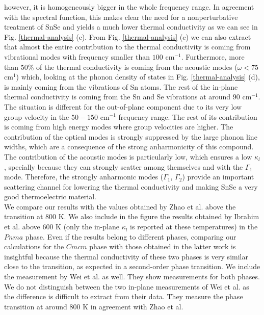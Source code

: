 however, it is homogeneously bigger in the whole frequency range. In agreement with the spectral function, this
makes clear the need for a nonperturbative treatment of SnSe and yields a much lower thermal conductivity as we can
see in Fig. \ref{thermal-analysis} (c). From Fig. \ref{thermal-analysis} (c) we can also extract that almost the 
entire contribution to the thermal conductivity is coming from vibrational modes with frequency smaller than $100$ 
cm$^{-1}$. Furthermore, more than $50\%$ of the thermal conductivity is coming from the acoustic modes
($\omega<75$ cm$^{1}$) which, looking at the phonon density of states in Fig. \ref{thermal-analysis} (d), is mainly
coming from the vibrations of Sn atoms. The rest of the in-plane thermal conductivity is coming from the Sn and Se
vibrations at around $90$ cm$^{-1}$. The situation is different for the out-of-plane component due to its very low
group velocity in the $50-150$ cm$^{-1}$ frequency range. The rest of its contribution is coming from high energy
modes where group velocities are higher. The contribution of the optical modes is strongly suppressed by the large
phonon line widths, which are a consequence of the strong anharmonicity of this compound. The contribution of the
acoustic modes is particularly low, which ensures a low $\kappa_l$, specially because they can strongly scatter
among themselves and with the $\Gamma_1$ mode. Therefore, the strongly anharmonic modes ($\Gamma_{1}$, $\Gamma_{2}$)
provide an important scattering channel for lowering the thermal conductivity and making SnSe a very good
thermoelectric material. \\

We compare our results with the values obtained by Zhao et al.\cite{zhao2014ultralow} above the transition at $800$ K. We also include in the figure the results obtained by Ibrahim et al.\cite{ibrahim2017reinvestigation} above $600$ K (only the in-plane $\kappa_l$ is reported at these temperatures) in the $Pnma$ phase. Even if the results belong to different phases, comparing our calculations for the $Cmcm$ phase with those obtained in the latter work is insightful because the thermal conductivity of these two phases is very similar close to the transition, as expected in a second-order phase transition. We include the measurement by Wei et al.\cite{wei2019thermoelectric} as well. They show 
measurements for both phases. We do not distinguish between the two in-plane measurements of Wei et al. as the 
difference is difficult to extract from their data. They measure the phase transition at around $800$ K in agreement 
with Zhao et al. \\

